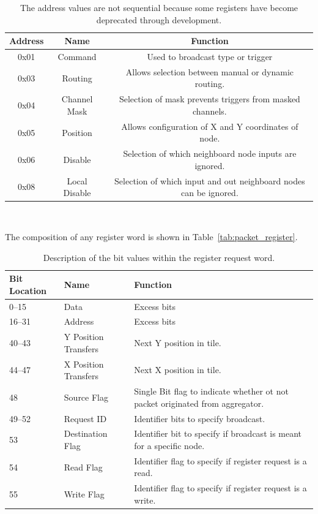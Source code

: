 \begin{table}
\begin{center}
\begin{tabular}{||c c c||}
 \hline
 Address & Name & Function \\ [0.5ex]
 \hline\hline
  0x01 & Command & Used to broadcast type or trigger \\
 \hline
  0x03 & Routing & Allows selection between manual or dynamic routing. \\
 \hline
  0x04 & Channel Mask & Selection of mask prevents triggers from masked channels. \\
 \hline
  0x05 & Position & Allows configuration of X and Y coordinates of node. \\
 \hline
  0x06 & Disable & Selection of which neighboard node inputs are ignored. \\
 \hline
  0x08 & Local Disable & Selection of which input and out neighboard nodes can be ignored. \\
 \hline
\end{tabular}
\caption{The address values are not sequential because some registers have become deprecated through development.}
\end{center}
\end{table}
~\label{table:node_registers}

The composition of any register word is shown in Table~\ref{tab:packet_register}.
\begin{table}
\begin{center}
\begin{tabular}{|| p{30mm} | p{30mm} | p{90mm} ||}
 \hline
 Bit Location & Name & Function \\ [0.5ex]
 \hline\hline
  0--15 & Data & Excess bits  \\
 \hline
  16--31 & Address & Excess bits  \\
 \hline
  40--43 & Y Position Transfers & Next Y position in tile. \\
 \hline
  44--47 & X Position Transfers & Next X position in tile. \\
 \hline
  48 & Source Flag & Single Bit flag to indicate whether ot not packet originated from aggregator. \\
 \hline
  49--52 & Request ID & Identifier bits to specify broadcast. \\
 \hline
  53 & Destination Flag & Identifier bit to specify if broadcast is meant for a specific node. \\
 \hline
  54 & Read Flag & Identifier flag to specify if register request is a read. \\
 \hline
  55 & Write Flag & Identifier flag to specify if register request is a write. \\
 \hline
\end{tabular}
\caption{Description of the bit values within the register request word.}
\end{center}
\end{table}
~\label{tab:packet_register}

